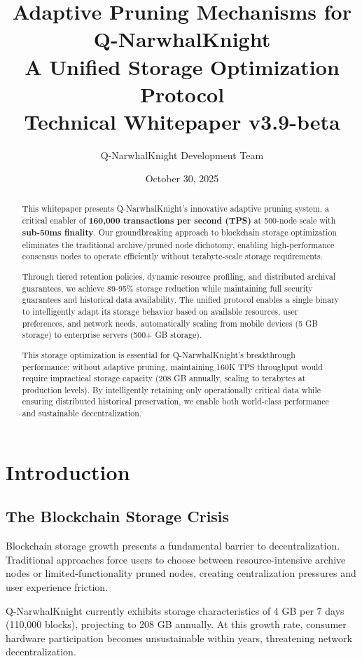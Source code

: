 \documentclass[11pt,a4paper]{article}
\title{\textbf{Adaptive Pruning Mechanisms for Q-NarwhalKnight}\\
\large{A Unified Storage Optimization Protocol}\\
\vspace{0.5em}
\normalsize{Technical Whitepaper v3.9-beta}}
\author{Q-NarwhalKnight Development Team}
\date{October 30, 2025}
\begin{document}
\maketitle

\begin{abstract}
This whitepaper presents Q-NarwhalKnight's innovative adaptive pruning system, a critical enabler of \textbf{160,000 transactions per second (TPS)} at 500-node scale with \textbf{sub-50ms finality}. Our groundbreaking approach to blockchain storage optimization eliminates the traditional archive/pruned node dichotomy, enabling high-performance consensus nodes to operate efficiently without terabyte-scale storage requirements.

Through tiered retention policies, dynamic resource profiling, and distributed archival guarantees, we achieve 89-95\% storage reduction while maintaining full security guarantees and historical data availability. The unified protocol enables a single binary to intelligently adapt its storage behavior based on available resources, user preferences, and network needs, automatically scaling from mobile devices (5 GB storage) to enterprise servers (500+ GB storage).

This storage optimization is essential for Q-NarwhalKnight's breakthrough performance: without adaptive pruning, maintaining 160K TPS throughput would require impractical storage capacity (208 GB annually, scaling to terabytes at production levels). By intelligently retaining only operationally critical data while ensuring distributed historical preservation, we enable both world-class performance and sustainable decentralization.
\end{abstract}

\section{Introduction}

\subsection{The Blockchain Storage Crisis}

Blockchain storage growth presents a fundamental barrier to decentralization. Traditional approaches force users to choose between resource-intensive archive nodes or limited-functionality pruned nodes, creating centralization pressures and user experience friction.

Q-NarwhalKnight currently exhibits storage characteristics of 4 GB per 7 days (110,000 blocks), projecting to 208 GB annually. At this growth rate, consumer hardware participation becomes unsustainable within years, threatening network decentralization.
\end{document}
